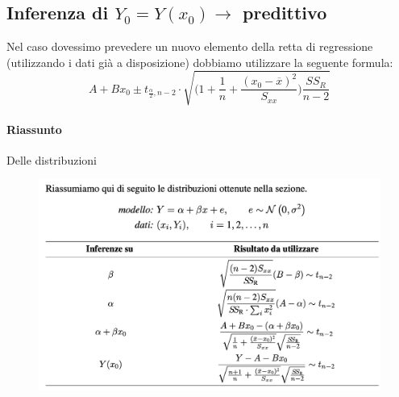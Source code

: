 \documentclass[]{article}
\begin{document}
    \subsection{Inferenza di $Y_0 = Y(x_0) \rightarrow$ predittivo}
    Nel caso dovessimo prevedere un nuovo elemento della retta di regressione (utilizzando i dati già a disposizione) dobbiamo utilizzare la seguente formula:
    \[ A+Bx_0 \pm t_{\frac{\alpha}{2},n-2} \cdot \sqrt{\Big(1+\frac{1}{n} + \frac{(x_0-\overline x)^2}{S_{xx}}\Big)\frac{SS_R}{n-2}} \]
    \paragraph{Riassunto} Delle distribuzioni
    \begin{figure}[H]
        \includegraphics[width=\textwidth]{images/boh_13.png}
    \end{figure}
\end{document}
